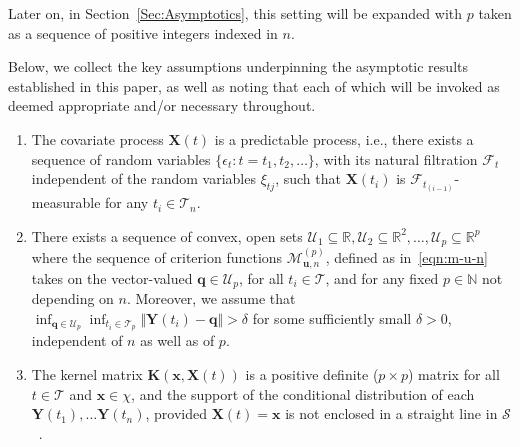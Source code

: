 \documentclass[aos]{imsart}
\theoremstyle{plain}
\theoremstyle{remark}
\def\R{\mathbb{R}}
\newcommand{\Fcal}{\mathcal{F}}
\newcommand{\Tcal}{\mathcal{T}}
\newcommand{\bb}[1]{\boldsymbol{#1}}
\newcommand{\kernel}[1]{\bb{K}(\bb{x}, \bb{X}(#1))}
\begin{document}
Later on, in Section~\ref{Sec:Asymptotics}, this setting will be expanded with $p$ taken as a sequence of positive integers indexed in $n$.


%
Below, we collect the key assumptions underpinning the asymptotic results established in this paper, as well as noting that each of which will be invoked as deemed appropriate and/or necessary throughout.
%

\begin{enumerate}[label=(A\arabic*),ref=(A\arabic*)]
    \item\label{assum:predictable} The covariate process $\bb{X}(t)$ is a predictable process, i.e., there exists a sequence of random variables $\{ \epsilon_{t}: t = t_1, t_2, \dots \}$, with its natural filtration $\Fcal_{t}$ independent of the random variables $\xi_{tj}$, such that $\bb{X}(t_i)$ is $\Fcal_{t_{(i-1)}}$-measurable for any $t_i \in \Tcal_n$.
    \item\label{assum:openconvex} There exists a sequence of convex, open sets $\mathcal{U}_1 \subseteq \R, \mathcal{U}_2 \subseteq \R^2, \ldots, \mathcal{U}_p  \subseteq \R^p$ where the sequence of criterion functions $\mathcal{M}_{\bb{u},n}^{(p)}$, defined as in~\eqref{eqn:m-u-n} takes on the vector-valued $\bb{q} \in \mathcal{U}_p$, for all $t_i \in \Tcal$, and for any fixed $p \in \mathbb{N}$ not depending on $n$. Moreover, we assume that $\inf_{\bb{q} \in \mathcal{U}_p} \inf_{t_i \in \Tcal_p} \Vert \bb{Y}(t_i) - \bb{q}\Vert > \delta$ for some sufficiently small $\delta > 0$, independent of $n$ as well as of $p$.
    \item\label{assum:kernelmatrix} The kernel matrix $\kernel{t}$ is a positive definite ($p\times p$) matrix for all $t \in \Tcal$ and $\bb{x} \in \chi$, and the support of the conditional distribution of each $\bb{Y}(t_1), \dots \bb{Y}(t_n)$, provided  $\bb{X}(t) = \bb{x}$ is not enclosed in a straight line in $\mathcal{S}$~\citep[cf.][]{ChowChau19}.
\end{enumerate}
\end{document}
